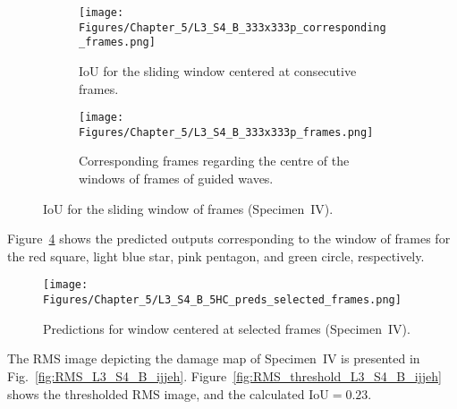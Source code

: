 \begin{figure} [!h]
	\centering
	\begin{subfigure}[b]{1\textwidth}
		\centering
		\texttt{[image: Figures/Chapter\_5/L3\_S4\_B\_333x333p\_corresponding\_frames.png]}
		\caption{IoU for the sliding window centered at consecutive frames.}
		\label{fig:L3_S4_B_333x333p_corresponding_frames}
	\end{subfigure}
	\par\medskip
	\begin{subfigure}[b]{1\textwidth}
		\centering
		\texttt{[image: Figures/Chapter\_5/L3\_S4\_B\_333x333p\_frames.png]}
		\caption{Corresponding frames regarding the centre of the windows of frames of guided waves.} 
		\label{fig:L3_S4_B_333x333p_frames}
	\end{subfigure}
	\caption{IoU for the sliding window of frames (Specimen~IV).}
	\label{fig:L3_S4_B_333x333p_50kHz_5HC_IoU_centre_window}
\end{figure} 

Figure~\ref{fig:L3_S4_B_5HC_preds_selected_frames} shows the predicted outputs corresponding to the window of frames for the red square, light blue star, pink pentagon, and green circle, respectively.
\begin{figure}[!ht]
	\centering
	\texttt{[image: Figures/Chapter\_5/L3\_S4\_B\_5HC\_preds\_selected\_frames.png]}
	\caption{Predictions for window centered at selected frames (Specimen~IV).}
	\label{fig:L3_S4_B_5HC_preds_selected_frames}
\end{figure}

The RMS image depicting the damage map of Specimen~IV is presented in Fig.~\ref{fig:RMS_L3_S4_B_ijjeh}.
Figure~\ref{fig:RMS_threshold_L3_S4_B_ijjeh} shows the thresholded RMS image, and the calculated IoU\(=0.23\).

